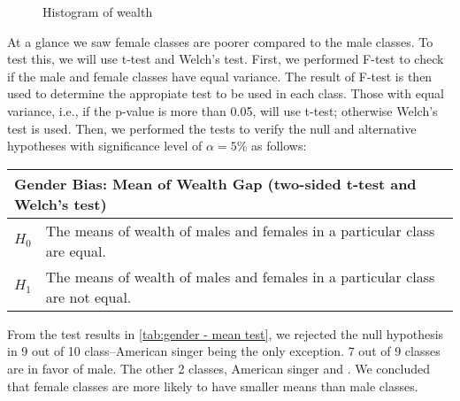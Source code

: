 \begin{figure}[!h]
\centering 
{}


\caption{Histogram of wealth} \label{fig:Histogram of Wealth}

\end{figure}

At a glance we saw female classes are poorer compared to the male classes. To test this, we will use t-test and Welch's test. First, we performed F-test to check if the male and female classes have equal variance. The result of F-test is then used to determine the appropiate test to be used in each class. Those with equal variance, i.e., if the p-value is more than 0.05, will use t-test; otherwise Welch's test is used. Then, we performed the tests to verify the null and alternative hypotheses with significance level of \(\alpha=5\%\) as follows:



\begin{table}[h!]
    \centering
    \renewcommand{\arraystretch}{1.3}
    \begin{tabular}{|l p{12cm}|} 
        \hline
        \multicolumn{2}{|l|}{\textbf{Gender Bias: Mean of Wealth Gap (two-sided t-test and Welch's test)}} \\
        \hline
        \textbf{$H_0$} & The means of wealth of males and females in a particular class are equal. \\
        \textbf{$H_1$} & The means of wealth of males and females in a particular class are not equal. \\
        \hline
    \end{tabular}
\end{table}

From the test results in \autoref{tab:gender - mean test}, we rejected the null hypothesis in 9 out of 10 class--American singer being the only exception. 7 out of 9 classes are in favor of male. The other 2 classes, American singer and . We concluded that female classes are more likely to have smaller means than male classes.

